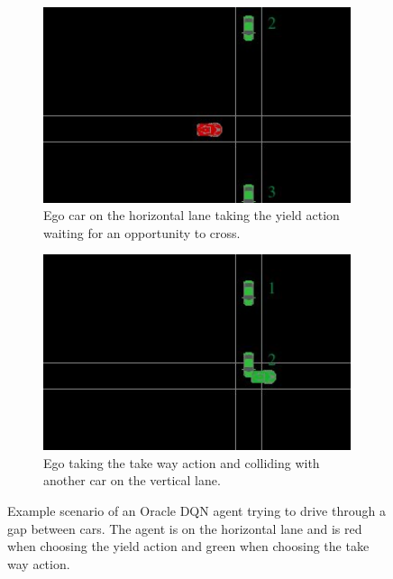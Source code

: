 \begin{figure}[h]
    \begin{subfigure}[b]{0.24\textwidth}
         \centering
         \includegraphics[width=0.99\textwidth]{figures/dqn collision example/dqn collision_1.jpeg}
         \caption{Ego car on the horizontal lane taking the yield action waiting for an opportunity to cross.}
    \end{subfigure}
    \hfill
    \begin{subfigure}[b]{0.24\textwidth}
     \centering
     \includegraphics[width=0.99\textwidth]{figures/dqn collision example/dqn collision_3.jpeg}
     \caption{Ego taking the take way action and colliding with another car on the vertical lane.}
    \end{subfigure}
    \centering
    \caption{Example scenario of an Oracle DQN agent trying to drive through a gap between cars. The agent is on the horizontal lane and is red when choosing the yield action and green when choosing the take way action.}
    \label{fig:dqn_collision}
\end{figure}

